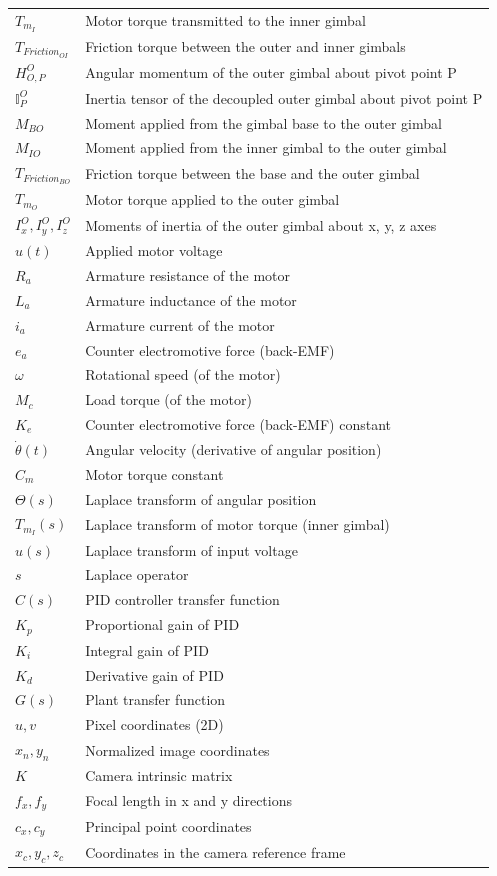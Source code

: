\begin{longtable}{ll}
$T_{m_I}$ & Motor torque transmitted to the inner gimbal \\
$T_{Friction_{OI}}$ & Friction torque between the outer and inner gimbals \\
$H_{O,P}^O$ & Angular momentum of the outer gimbal about pivot point P \\
$\mathbb{I}_{P}^{O}$ & Inertia tensor of the decoupled outer gimbal about pivot point P \\
$M_{BO}$ & Moment applied from the gimbal base to the outer gimbal \\
$M_{IO}$ & Moment applied from the inner gimbal to the outer gimbal \\
$T_{Friction_{BO}}$ & Friction torque between the base and the outer gimbal \\
$T_{m_O}$ & Motor torque applied to the outer gimbal \\
$I_x^O, I_y^O, I_z^O$ & Moments of inertia of the outer gimbal about x, y, z axes \\
$u(t)$ & Applied motor voltage \\
$R_a$ & Armature resistance of the motor \\
$L_a$ & Armature inductance of the motor \\
$i_a$ & Armature current of the motor \\
$e_a$ & Counter electromotive force (back-EMF) \\
$\omega$ & Rotational speed (of the motor) \\
$M_c$ & Load torque (of the motor) \\
$K_e$ & Counter electromotive force (back-EMF) constant \\
$\dot{\theta}(t)$ & Angular velocity (derivative of angular position) \\
$C_m$ & Motor torque constant \\
$\Theta(s)$ & Laplace transform of angular position \\
$T_{m_I}(s)$ & Laplace transform of motor torque (inner gimbal) \\
$u(s)$ & Laplace transform of input voltage \\
$s$ & Laplace operator \\
$C(s)$ & PID controller transfer function \\
$K_p$ & Proportional gain of PID \\
$K_i$ & Integral gain of PID \\
$K_d$ & Derivative gain of PID \\
$G(s)$ & Plant transfer function \\
$u, v$ & Pixel coordinates (2D) \\
$x_n, y_n$ & Normalized image coordinates \\
$K$ & Camera intrinsic matrix \\
$f_x, f_y$ & Focal length in x and y directions \\
$c_x, c_y$ & Principal point coordinates \\
$x_c, y_c, z_c$ & Coordinates in the camera reference frame \\
\end{longtable}